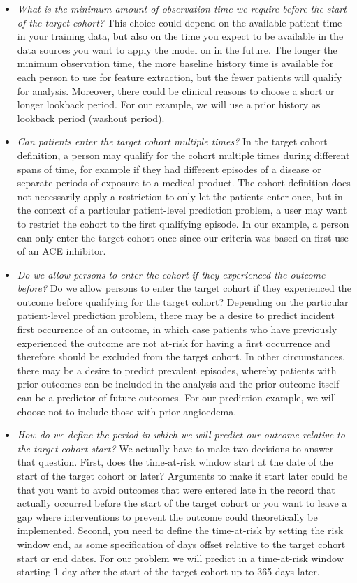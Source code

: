 \documentclass[11pt]{book}
\theoremstyle{definition}
\theoremstyle{definition}
\theoremstyle{definition}
\theoremstyle{remark}
\begin{document}
\begin{itemize}
\item
  \emph{What is the minimum amount of observation time we require before the start of the target cohort?} This choice could depend on the available patient time in your training data, but also on the time you expect to be available in the data sources you want to apply the model on in the future. The longer the minimum observation time, the more baseline history time is available for each person to use for feature extraction, but the fewer patients will qualify for analysis. Moreover, there could be clinical reasons to choose a short or longer lookback period. For our example, we will use a prior history as lookback period (washout period).
\item
  \emph{Can patients enter the target cohort multiple times?} In the target cohort definition, a person may qualify for the cohort multiple times during different spans of time, for example if they had different episodes of a disease or separate periods of exposure to a medical product. The cohort definition does not necessarily apply a restriction to only let the patients enter once, but in the context of a particular patient-level prediction problem, a user may want to restrict the cohort to the first qualifying episode. In our example, a person can only enter the target cohort once since our criteria was based on first use of an ACE inhibitor.
\item
  \emph{Do we allow persons to enter the cohort if they experienced the outcome before?} Do we allow persons to enter the target cohort if they experienced the outcome before qualifying for the target cohort? Depending on the particular patient-level prediction problem, there may be a desire to predict incident first occurrence of an outcome, in which case patients who have previously experienced the outcome are not at-risk for having a first occurrence and therefore should be excluded from the target cohort. In other circumstances, there may be a desire to predict prevalent episodes, whereby patients with prior outcomes can be included in the analysis and the prior outcome itself can be a predictor of future outcomes. For our prediction example, we will choose not to include those with prior angioedema.
\item
  \emph{How do we define the period in which we will predict our outcome relative to the target cohort start?} We actually have to make two decisions to answer that question. First, does the time-at-risk window start at the date of the start of the target cohort or later? Arguments to make it start later could be that you want to avoid outcomes that were entered late in the record that actually occurred before the start of the target cohort or you want to leave a gap where interventions to prevent the outcome could theoretically be implemented. Second, you need to define the time-at-risk by setting the risk window end, as some specification of days offset relative to the target cohort start or end dates. For our problem we will predict in a time-at-risk window starting 1 day after the start of the target cohort up to 365 days later.

\end{itemize}
\end{document}
